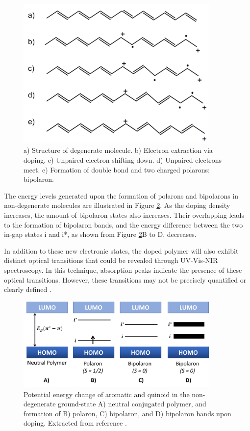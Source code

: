 \begin{figure}[h]
  \centering
  \includegraphics[width=10cm]{Images/pdf/bipolaron.pdf}
  \caption[Representation of bipolaron formation introduced via doping]{a) Structure of degenerate molecule. b) Electron extraction via doping. c) Unpaired electron shifting down. d) Unpaired electrons meet. e) Formation of double bond and two charged polarons: bipolaron.}
  \label{fig:bipol}
\end{figure}

The energy levels generated upon the formation of polarons and bipolarons in non-degenerate molecules are illustrated in Figure \ref{fig:ebipol}. As the doping density increases, the amount of bipolaron states also increases. Their overlapping leads to the formation of bipolaron bands, and the energy difference between the two in-gap states i and i*, as shown from Figure \ref{fig:ebipol}B to D, decreases. %

In addition to these new electronic states, the doped polymer will also exhibit distinct optical transitions that could be revealed through UV-Vis-NIR spectroscopy. In this technique, absorption peaks indicate the presence of these optical transitions. However, these transitions may not be precisely quantified or clearly defined \cite{heydarigharahcheshmehTextureNanostructuralEngineering2020}.

\begin{figure}[h]
  \centering
  \includegraphics[width=10cm]{Images/pdf/bipolaron_bands.pdf}
  \caption[Formation of polaron, bipolaron, and bipolaron band]{Potential energy change of aromatic and quinoid in the non-degenerate ground-state A) neutral conjugated polymer, and formation of B) polaron, C) bipolaron, and D) bipolaron bands upon doping. Extracted from reference \cite{heydarigharahcheshmehTextureNanostructuralEngineering2020}.}
  \label{fig:ebipol}
\end{figure}

